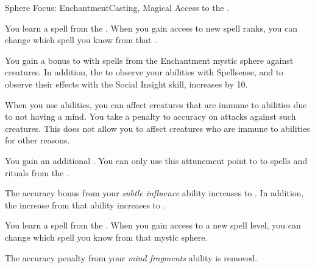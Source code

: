     \begin{feat}{Sphere Focus: Enchantment}{Casting, Magical}
        \featpre Access to the  .

         You learn a spell from the  .
        When you gain access to new spell ranks, you can change which spell you know from that .

         You gain a  bonus to  with spells from the Enchantment mystic sphere against  creatures.
        In addition, the  to observe your  abilities with Spellsense, and to observe their effects with the Social Insight skill, increases by 10.

         When you use  abilities, you can affect creatures that are immune to  abilities due to not having a mind.
        You take a  penalty to accuracy on attacks against such creatures.
        This does not allow you to affect creatures who are immune to  abilities for other reasons.

         You gain an additional .
        You can only use this attunement point to  to spells and rituals from the  .

         The accuracy bonus from your \textit{subtle influence} ability increases to .
        In addition, the  increase from that ability increases to .

         You learn a spell from the  .
        When you gain access to a new spell level, you can change which spell you know from that mystic sphere.

         The accuracy penalty from your \textit{mind fragments} ability is removed.
    \end{feat}

